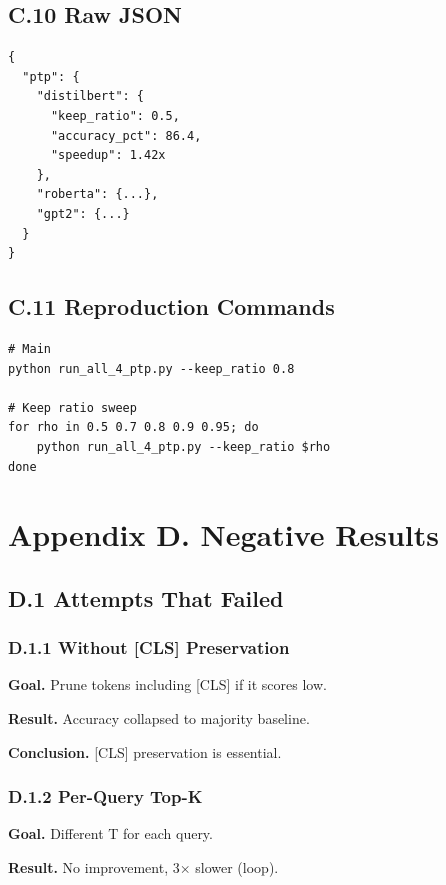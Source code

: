 \subsection{C.10 Raw JSON}

\begin{lstlisting}
{
  "ptp": {
    "distilbert": {
      "keep_ratio": 0.5,
      "accuracy_pct": 86.4,
      "speedup": 1.42x
    },
    "roberta": {...},
    "gpt2": {...}
  }
}
\end{lstlisting}

\subsection{C.11 Reproduction Commands}

\begin{lstlisting}
# Main
python run_all_4_ptp.py --keep_ratio 0.8

# Keep ratio sweep
for rho in 0.5 0.7 0.8 0.9 0.95; do
    python run_all_4_ptp.py --keep_ratio $rho
done
\end{lstlisting}




\section{Appendix D. Negative Results}

\subsection{D.1 Attempts That Failed}

\subsubsection{D.1.1 Without [CLS] Preservation}

\textbf{Goal.} Prune tokens including [CLS] if it scores low.

\textbf{Result.} Accuracy collapsed to majority baseline.

\textbf{Conclusion.} [CLS] preservation is essential.

\subsubsection{D.1.2 Per-Query Top-K}

\textbf{Goal.} Different T for each query.

\textbf{Result.} No improvement, 3$\times$ slower (loop).

